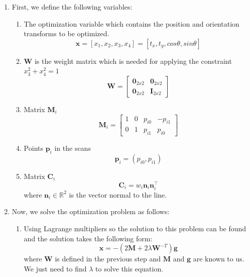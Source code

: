 \documentclass[letta4 paper]{article}
\numberwithin{equation}{section}
\newcommand{\0}{\mathbf{0}}
\begin{document}
	\begin{enumerate}
		\item First, we define the following variables:
		\begin{enumerate}
			\item The optimization variable which contains the position and orientation transforms to be optimized.
			\[
			\mathbf{ x}=[x_1, x_2, x_3, x_4]=[t_x, t_y,cos \theta, sin \theta]
			\] 
			
			\item \textbf{W} is the weight matrix which is needed for applying the constraint $x_3^2 + x_4^2 = 1$
			\[
			\mathbf{W} = 
			\begin{bmatrix}
			\mathbf{0}_{2x2} & \mathbf{0}_{2x2} \\
			\mathbf{0}_{2x2} & \mathbf{I}_{2x2} 
			\end{bmatrix}
			\]
			
			\item Matrix $\mathbf{M}_i$		
			\[
			\mathbf{M}_i = 
			\begin{bmatrix}
			1 & 0 & p_{i0} & -p_{i1}\\
			0 & 1 & p_{i1} & p_{i0}
			\end{bmatrix}
			\]
			
			\item Points $\mathbf{p}_i$ in the scans
			\[
			\mathbf{p}_i = (p_{i0}, p_{i1})
			\]
			
			\item Matrix $\mathbf{C}_i$	
			\[
			\mathbf{C}_i = w_i\mathbf{n}_i \mathbf{n}_i^\intercal 
			\]
			where $\mathbf{n}_i \in \mathbb{R}^2$ is the vector normal to the line.
		\end{enumerate}
	
	\item Now, we solve the optimization problem as follows:
	
	\begin{enumerate}
		\item Using Lagrange multipliers so the solution to this problem can be found and the solution takes the following form:
		\begin{equation}
		\mathbf{x} = -(2\mathbf{M} + 2 \lambda \mathbf{W}^{-T})\mathbf{g}
		\label{eq:lagrange}
		\end{equation}
		where $\mathbf{W}$ is defined in the previous step and $\mathbf{M}$ and $\mathbf{g}$ are known to us. We just need to find $\lambda$ to solve this equation.
		

\end{enumerate}
\end{enumerate}
\end{document}
